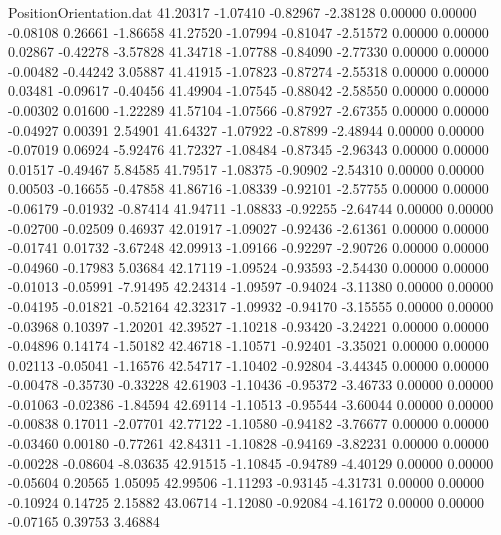 \begin{filecontents}{PositionOrientation.dat}
  41.20317   -1.07410   -0.82967    -2.38128    0.00000    0.00000   -0.08108    0.26661   -1.86658
  41.27520   -1.07994   -0.81047    -2.51572    0.00000    0.00000    0.02867   -0.42278   -3.57828
  41.34718   -1.07788   -0.84090    -2.77330    0.00000    0.00000   -0.00482   -0.44242    3.05887
  41.41915   -1.07823   -0.87274    -2.55318    0.00000    0.00000    0.03481   -0.09617   -0.40456
  41.49904   -1.07545   -0.88042    -2.58550    0.00000    0.00000   -0.00302    0.01600   -1.22289
  41.57104   -1.07566   -0.87927    -2.67355    0.00000    0.00000   -0.04927    0.00391    2.54901
  41.64327   -1.07922   -0.87899    -2.48944    0.00000    0.00000   -0.07019    0.06924   -5.92476
  41.72327   -1.08484   -0.87345    -2.96343    0.00000    0.00000    0.01517   -0.49467    5.84585
  41.79517   -1.08375   -0.90902    -2.54310    0.00000    0.00000    0.00503   -0.16655   -0.47858
  41.86716   -1.08339   -0.92101    -2.57755    0.00000    0.00000   -0.06179   -0.01932   -0.87414
  41.94711   -1.08833   -0.92255    -2.64744    0.00000    0.00000   -0.02700   -0.02509    0.46937
  42.01917   -1.09027   -0.92436    -2.61361    0.00000    0.00000   -0.01741    0.01732   -3.67248
  42.09913   -1.09166   -0.92297    -2.90726    0.00000    0.00000   -0.04960   -0.17983    5.03684
  42.17119   -1.09524   -0.93593    -2.54430    0.00000    0.00000   -0.01013   -0.05991   -7.91495
  42.24314   -1.09597   -0.94024    -3.11380    0.00000    0.00000   -0.04195   -0.01821   -0.52164
  42.32317   -1.09932   -0.94170    -3.15555    0.00000    0.00000   -0.03968    0.10397   -1.20201
  42.39527   -1.10218   -0.93420    -3.24221    0.00000    0.00000   -0.04896    0.14174   -1.50182
  42.46718   -1.10571   -0.92401    -3.35021    0.00000    0.00000    0.02113   -0.05041   -1.16576
  42.54717   -1.10402   -0.92804    -3.44345    0.00000    0.00000   -0.00478   -0.35730   -0.33228
  42.61903   -1.10436   -0.95372    -3.46733    0.00000    0.00000   -0.01063   -0.02386   -1.84594
  42.69114   -1.10513   -0.95544    -3.60044    0.00000    0.00000   -0.00838    0.17011   -2.07701
  42.77122   -1.10580   -0.94182    -3.76677    0.00000    0.00000   -0.03460    0.00180   -0.77261
  42.84311   -1.10828   -0.94169    -3.82231    0.00000    0.00000   -0.00228   -0.08604   -8.03635
  42.91515   -1.10845   -0.94789    -4.40129    0.00000    0.00000   -0.05604    0.20565    1.05095
  42.99506   -1.11293   -0.93145    -4.31731    0.00000    0.00000   -0.10924    0.14725    2.15882
  43.06714   -1.12080   -0.92084    -4.16172    0.00000    0.00000   -0.07165    0.39753    3.46884

\end{filecontents}
